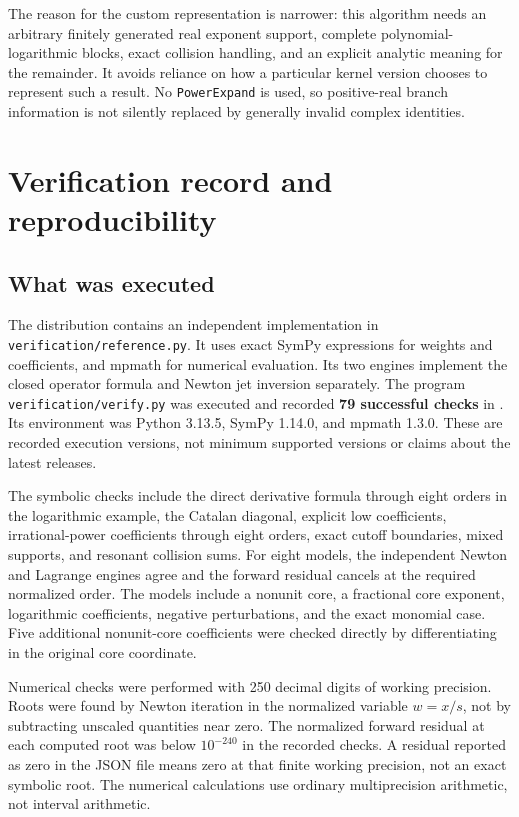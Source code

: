 \documentclass[11pt,a4paper]{article}
\numberwithin{equation}{section}
\theoremstyle{definition}
\newcommand{\code}[1]{\texttt{#1}}
\begin{document}
The reason for the custom representation is narrower: this algorithm
needs an arbitrary finitely generated real exponent support, complete
polynomial-logarithmic blocks, exact collision handling, and an explicit
analytic meaning for the remainder. It avoids reliance on how a
particular kernel version chooses to represent such a result. No
\code{PowerExpand} is used, so positive-real branch information is not
silently replaced by generally invalid complex identities.

\section{Verification record and reproducibility}
\label{sec:verification}

\subsection{What was executed}
The distribution contains an independent implementation in
\code{verification/reference.py}. It uses exact SymPy expressions for
weights and coefficients, and mpmath for numerical evaluation. Its two
engines implement the closed operator formula and Newton jet inversion
separately. The program \code{verification/verify.py} was executed and
recorded \textbf{79 successful checks} in
. Its environment was Python
3.13.5, SymPy 1.14.0, and mpmath 1.3.0. These are recorded execution
versions, not minimum supported versions or claims about the latest
releases.

The symbolic checks include the direct derivative formula through eight
orders in the logarithmic example, the Catalan diagonal, explicit low
coefficients, irrational-power coefficients through eight orders, exact
cutoff boundaries, mixed supports, and resonant collision sums. For eight
models, the independent Newton and Lagrange engines agree and the forward
residual cancels at the required normalized order. The models include a
nonunit core, a fractional core exponent, logarithmic coefficients,
negative perturbations, and the exact monomial case. Five additional
nonunit-core coefficients were checked directly by differentiating in
the original core coordinate.

Numerical checks were performed with 250 decimal digits of working
precision. Roots were found by Newton iteration in the normalized
variable $w=x/s$, not by subtracting unscaled quantities near zero.
The normalized forward residual at each computed root was below
$10^{-240}$ in the recorded checks. A residual reported as zero in the
JSON file means zero at that finite working precision, not an exact
symbolic root. The numerical calculations use ordinary multiprecision
arithmetic, not interval arithmetic.
\end{document}

